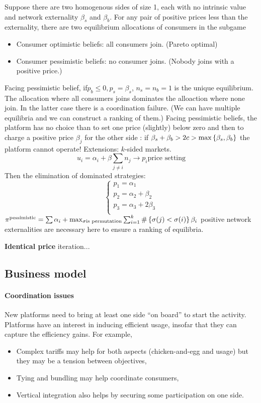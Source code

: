 Suppose there are two homogenous sides of size 1, each with no intrinsic value and network externality $\beta_s$ and $\beta_b$. For any pair of positive prices less than the externality, there are two equilibrium allocations of consumers in the subgame 
\begin{itemize}
    \item Consumer optimistic beliefs: all consumers join. (Pareto optimal)
    \item Consumer pessimistic beliefs: no consumer joins. (Nobody joins with a positive price.)
\end{itemize}
Facing pessimistic belief, if$p_b\le 0, p_s=\beta_s$, $n_s=n_b=1$ is the unique equilibrium.
The allocation where all consumers joins dominates the alloaction where none join. In the latter case there is a coordination failure. (We can have multiple equilibria and we can construct a ranking of them.)
Facing pessimistic beliefs, the platform has no choice than to set one price (slightly) below zero and then to charge a positive price $\beta_j$ for the other side : if $\beta_s+\beta_b>2c>\max \left\{\beta_s,\beta_b\right\}$ the platform cannot operate!
Extensions: $k$-sided markets.
\begin{equation}
    u_i=\alpha_i + \beta \sum_{j\neq i} n_j \to p_i \text{price setting} 
\end{equation}
Then the elimination of dominated strategies:
\begin{equation}
    \begin{cases}
        p_1=\alpha_1\\
        p_2=\alpha_2+\beta_2\\
        p_3=\alpha_3+2\beta_3\\
    \end{cases}
\end{equation}
$\pi^\text{pessimistic} = \sum \alpha_i + \max_{\sigma \text{is permutation}} \sum_{i=1}^{k} \# \left\{\sigma(j)<\sigma(i)\right\}\beta_i$
positive network externalities are necessary here to ensure a ranking of equilibria.

\textbf{Identical price}
iteration...
\subsection{Business model}
\paragraph{Coordination issues} New platforms need to bring at
least one side “on board” to start the activity. Platforms have an interest in inducing efficient usage, insofar that they can capture the efficiency gains. For example, \begin{itemize}
    \item Complex tariffs may help for both aspects (chicken-and-egg and usage) but they may be a tension between objectives,
    \item Tying and bundling may help coordinate consumers,
    \item Vertical integration also helps by securing some participation on one side.
\end{itemize}

